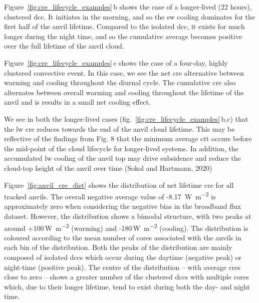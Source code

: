 Figure~\ref{fig:cre_lifecycle_examples}\,b shows the case of a longer-lived (22 hours), clustered \acrshort{dcc}.
It initiates in the morning, and so the \acrshort{sw} cooling dominates for the
first half of the anvil lifetime. Compared to the isolated \acrshort{dcc}, it
exists for much longer during the night time, and so the cumulative
average becomes positive over the full lifetime of the anvil cloud.

Figure~\ref{fig:cre_lifecycle_examples}\,c shows the case of a four-day, highly clustered convective
event. In this case, we see the net \acrshort{cre} alternative between warming and
cooling throughout the diurnal cycle. The cumulative \acrshort{cre} also alternates
between overall warming and cooling throughout the lifetime of the anvil
and is results in a small net cooling effect.

We see in both the longer-lived cases (fig.~\ref{fig:cre_lifecycle_examples}\,b,c) that the \acrshort{lw}
\acrshort{cre} reduces towards the end of the anvil cloud lifetime. This may be
reflective of the findings from Fig. 8 that the minimum average \acrshort{ctt}
occurs before the mid-point of the cloud lifecycle for longer-lived
systems. In addition, the accumulated \acrshort{lw} cooling of the anvil top may
drive subsidence and reduce the cloud-top height of the anvil over time
(Sokol and Hartmann, 2020)

Figure~\ref{fig:anvil_cre_dist} shows the distribution of net lifetime \acrshort{cre} for all tracked
anvils. The overall negative average value of -8.17
\,\unit{W m^{-2}} is approximately zero when considering the
negative bias in the broadband flux dataset. However, the distribution
shows a bimodal structure, with two peaks at around
+100\,\unit{W m^{-2}} (warming) and -180\,\unit{W m^{-2}}
(cooling). The distribution is coloured according to the mean number of
cores associated with the anvils in each bin of the distribution. Both
the peaks of the distribution are mainly composed of isolated \acrshort{dcc}s which
occur during the daytime (negative peak) or night-time (positive peak).
The centre of the distribution -- with average \acrshort{cre}s close to zero --
shows a greater number of the clustered \acrshort{dcc}s with multiple cores which,
due to their longer lifetime, tend to exist during both the day- and
night time.


